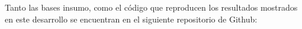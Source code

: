

Tanto las bases insumo, como el código que reproducen los resultados mostrados en este desarrollo se encuentran en el siguiente repositorio de Github:
